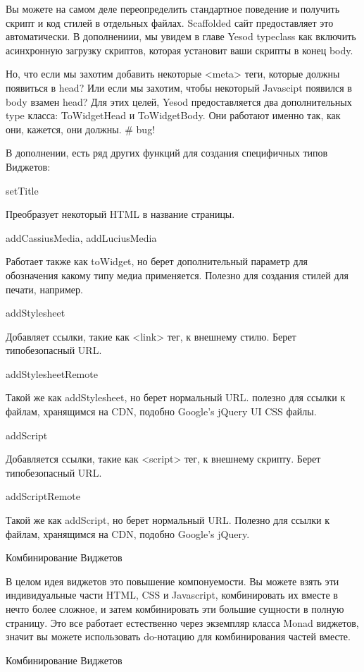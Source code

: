 Вы можете на самом деле переопределить стандартное поведение и получить скрипт и код стилей в отдельных файлах. Scaffolded сайт предоставляет это автоматически. В дополнениии, мы увидем в главе Yesod typeclass как включить асинхронную загрузку скриптов, которая установит ваши скрипты в конец body.

Но, что если мы захотим добавить некоторые <meta> теги, которые должны появиться в head? Или если мы захотим, чтобы некоторый Javascipt появился в body взамен head? Для этих целей, Yesod предоставляется два дополнительных type класса: ToWidgetHead и ToWidgetBody. Они работают именно так, как они, кажется, они должны. # bug!

В дополнении, есть ряд других функций для создания специфичных типов Виджетов:

setTitle

Преобразует некоторый HTML в название страницы.

addCassiusMedia, addLuciusMedia

Работает также как toWidget, но берет дополнительный параметр для обозначения какому типу медиа применяется. Полезно для создания стилей для печати, например.

addStylesheet

Добавляет ссылки, такие как <link> тег, к внешнему стилю. Берет типобезопасный URL.

addStylesheetRemote

Такой же как addStylesheet, но берет нормальный URL. полезно для ссылки к файлам, хранящимся на CDN, подобно Google's jQuery UI CSS файлы.

addScript

Добавляется ссылки, такие как <script> тег, к внешнему скрипту. Берет типобезопасный URL. 

addScriptRemote

Такой же как addScript, но берет нормальный URL. Полезно для ссылки к файлам, хранящимся на CDN, подобно Google's jQuery.

Комбинирование Виджетов

В целом идея виджетов это повышение компонуемости. Вы можете взять эти индивидуальные части HTML, CSS и Javascript, комбинировать их вместе в нечто более сложное, и затем комбинировать эти большие сущности в полную страницу. Это все работает естественно через экземпляр класса Monad виджетов, значит вы можете использовать do-нотацию для комбинирования частей вместе.

Комбинирование Виджетов

